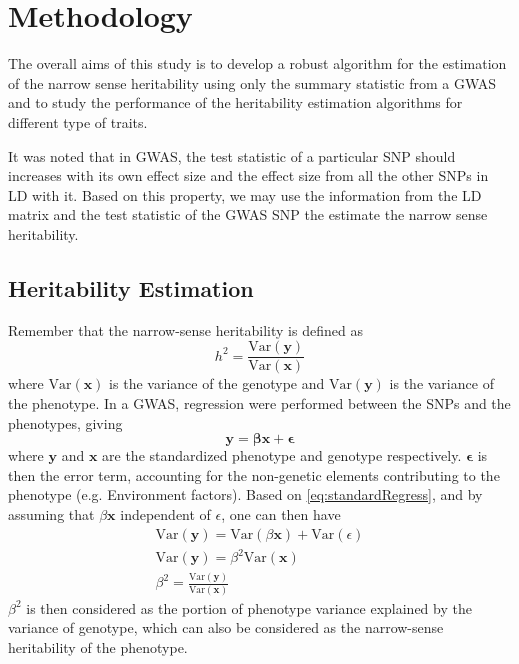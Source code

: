 	\section{Methodology}	
		The overall aims of this study is to develop a robust algorithm for the estimation of the narrow sense heritability using only the summary statistic from a \gls{GWAS} and to study the performance of the heritability estimation algorithms for different type of traits.
		
		It was noted that in \gls{GWAS}, the test statistic of a particular \gls{SNP} should increases with its own effect size and the effect size from all the other \glspl{SNP} in \gls{LD} with it.
		Based on this property, we may use the information from the \gls{LD} matrix and the test statistic of the \gls{GWAS} \gls{SNP} the estimate the narrow sense heritability.
		
		
		\subsection{Heritability Estimation}
			Remember that the narrow-sense heritability is defined as 
			$$
				h^2 = \frac{\mathrm{Var}(\boldsymbol{y})}{\mathrm{Var}(\boldsymbol{x})}
			$$
			where $\mathrm{Var}(\boldsymbol{x})$ is the variance of the genotype and $\mathrm{Var}(\boldsymbol{y})$ is the variance of the phenotype.
			In a \gls{GWAS}, regression were performed between the \glspl{SNP} and the phenotypes, giving
			\begin{equation}
				\boldsymbol{y}=\boldsymbol{\beta x}+\boldsymbol{\epsilon}
				\label{eq:standardRegress}
			\end{equation}
			where $\boldsymbol{y}$ and $\boldsymbol{x}$ are the standardized phenotype and genotype respectively. 
			$\boldsymbol{\epsilon}$ is then the error term, accounting for the non-genetic elements contributing to the phenotype (e.g. Environment factors).
			Based on \cref{eq:standardRegress}, and by assuming that $\beta \boldsymbol{x}$ independent of $\epsilon$, one can then have
			\begin{align}
				\mathrm{Var}(\boldsymbol{y}) = \mathrm{Var}(\beta \boldsymbol{x})+ \mathrm{Var}(\epsilon) \nonumber\\
				\mathrm{Var}(\boldsymbol{y}) = \beta^2\mathrm{Var}(\boldsymbol{x}) \nonumber\\
				\beta^2= \frac{\mathrm{Var}(\boldsymbol{y})}{\mathrm{Var}(\boldsymbol{x})}
				\label{eq:betaHeri}
			\end{align}
			$\beta^2$ is then considered as the portion of phenotype variance explained by the variance of genotype, which can also be considered as the narrow-sense heritability of the phenotype.
					
